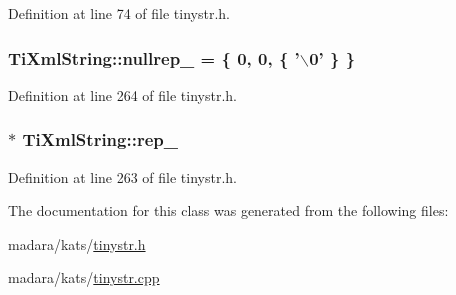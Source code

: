 Definition at line 74 of file tinystr.h.

\hypertarget{classTiXmlString_ae1f9e0de28328eed27d5623ff67a3191}{
\subsubsection[{nullrep\_\-}]{ {\bf TiXmlString::nullrep\_\-} = \{ 0, 0, \{ '$\backslash$0' \} \}}}
\label{d1/d15/classTiXmlString_ae1f9e0de28328eed27d5623ff67a3191}


Definition at line 264 of file tinystr.h.

\hypertarget{classTiXmlString_ac7be48f31ca451bcb16de428b5c40e0c}{
\subsubsection[{rep\_\-}]{$\ast$ {\bf TiXmlString::rep\_\-}}}
\label{d1/d15/classTiXmlString_ac7be48f31ca451bcb16de428b5c40e0c}


Definition at line 263 of file tinystr.h.



The documentation for this class was generated from the following files:\begin{DoxyCompactItemize}
\item 
madara/kats/\hyperlink{tinystr_8h}{tinystr.h}\item 
madara/kats/\hyperlink{tinystr_8cpp}{tinystr.cpp}\end{DoxyCompactItemize}
